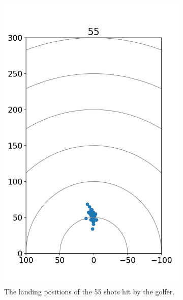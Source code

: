 \documentclass{kththesis}
\begin{document}
\begin{figure}
\begin{subfigure}{0.4\textwidth}
    \includegraphics[height=0.4\textheight]{Shots/55_shots.png} 
    \caption{The landing positions of the 55 shots hit by the golfer.}
    \label{fig:55_shots}
    \end{subfigure}
    \begin{subfigure}{0.4\textwidth}
    \centering

\end{subfigure}
\end{figure}
\end{document}
